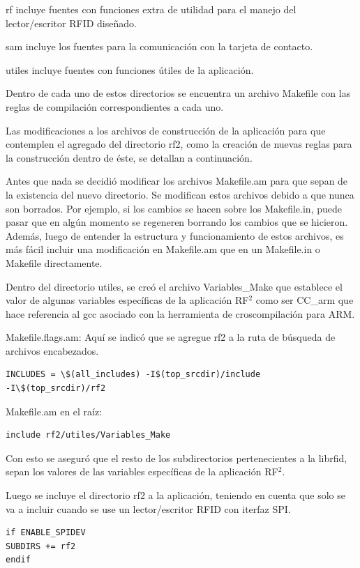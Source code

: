 rf incluye fuentes con funciones extra de utilidad para el manejo del lector/escritor RFID diseñado.

sam incluye los fuentes para la comunicación con la tarjeta de contacto.

utiles incluye fuentes con funciones útiles de la aplicación.

\bigskip
Dentro de cada uno de estos directorios se encuentra un archivo Makefile con las reglas de compilación correspondientes a cada uno.

\bigskip
Las modificaciones a los archivos de construcción de la aplicación para que contemplen el agregado del directorio rf2, como la creación de nuevas reglas para la construcción dentro de éste, se detallan a continuación.

\bigskip
Antes que nada se decidió modificar los archivos Makefile.am para que sepan de la existencia del nuevo directorio. Se modifican estos archivos debido a que nunca son borrados. Por ejemplo, si los cambios se hacen sobre los Makefile.in, puede pasar que en algún momento se regeneren borrando los cambios que se hicieron. Además, luego de entender la estructura y funcionamiento de estos archivos, es más fácil incluir una modificación en Makefile.am que en un Makefile.in o Makefile directamente.

Dentro del directorio utiles, se creó el archivo Variables\_Make que establece el valor de algunas variables específicas de la aplicación RF$^{2}$ como ser CC\_arm que hace referencia al gcc asociado con la herramienta de croscompilación para ARM. 

\bigskip
Makefile.flags.am:
Aquí se indicó que se agregue rf2 a la ruta de búsqueda de archivos encabezados.

\begin{verbatim}
INCLUDES = \$(all_includes) -I$(top_srcdir)/include 
-I\$(top_srcdir)/rf2
\end{verbatim}

Makefile.am en el raíz:

\begin{verbatim}
include rf2/utiles/Variables_Make
\end{verbatim}
Con esto se aseguró que el resto de los subdirectorios pertenecientes a la librfid, sepan los valores de las variables específicas de la aplicación RF$^{2}$.

\bigskip
Luego se incluye el directorio rf2 a la aplicación, teniendo en cuenta que solo se va a incluir cuando se use un lector/escritor RFID con iterfaz SPI.
\begin{verbatim}
if ENABLE_SPIDEV 
SUBDIRS += rf2 
endif
\end{verbatim}

